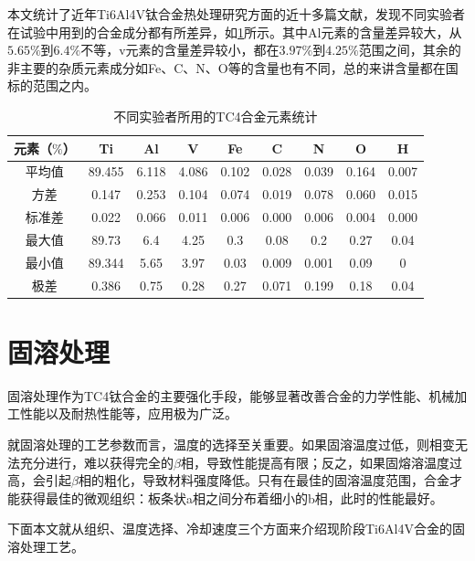 \documentclass[
class = book,
zihao = -4,
font = noto,
paper = a4paper,
openany
]{easybook}
\newcommand{\ti}{Ti6Al4V}
\begin{document}
本文统计了近年\ti 钛合金热处理研究方面的近十多篇文献，发现不同实验者在试验中用到的合金成分都有所差异，如\ref{sec:mytc4ave}所示。其中Al元素的含量差异较大，从$ 5.65\% $到$ 6.4\% $不等，v元素的含量差异较小，都在$ 3.97 \%$到$ 4.25\% $范围之间，其余的非主要的杂质元素成分如Fe、C、N、O等的含量也有不同，总的来讲含量都在国标的范围之内。
\begin{table}[htbp]
	\centering
	\caption{不同实验者所用的TC4合金元素统计}
	\label{sec:mytc4ave}
	\begin{tabular}{ccccccccc}
		\toprule
元素（$ \% $）& Ti  & Al & V &Fe &C& N& O &H \\ \midrule
平均值 & 89.455 & 6.118 & 4.086 & 0.102 & 0.028 & 0.039 & 0.164 & 0.007 \\
方差 & 0.147 & 0.253 & 0.104 & 0.074 & 0.019 & 0.078 & 0.060 & 0.015 \\
标准差 & 0.022 & 0.066 & 0.011 & 0.006 & 0.000 & 0.006 & 0.004 & 0.000 \\
最大值 & 89.73 & 6.4 & 4.25 & 0.3 & 0.08 & 0.2 & 0.27 & 0.04 \\
最小值 & 89.344 & 5.65 & 3.97 & 0.03 & 0.009 & 0.001 & 0.09 & 0 \\
极差 & 0.386 & 0.75 & 0.28 & 0.27 & 0.071 & 0.199 & 0.18 & 0.04 \\
		\bottomrule
	\end{tabular}
\end{table}




\chapter{固溶处理}
固溶处理作为TC4钛合金的主要强化手段，能够显著改善合金的力学性能、机械加工性能以及耐热性能等，应用极为广泛。

就固溶处理的工艺参数而言，温度的选择至关重要。如果固溶温度过低，则相变无法充分进行，难以获得完全的$\beta$相，导致性能提高有限；反之，如果固熔溶温度过高，会引起$ \beta $相的粗化，导致材料强度降低。只有在最佳的固溶温度范围，合金才能获得最佳的微观组织：板条状a相之间分布着细小的b相，此时的性能最好。

下面本文就从组织、温度选择、冷却速度三个方面来介绍现阶段\ti 合金的固溶处理工艺。
\end{document}
